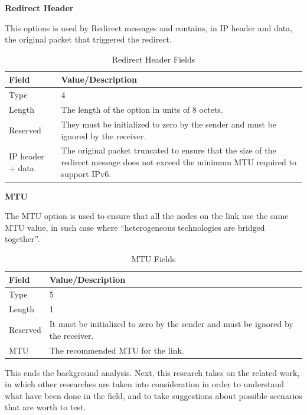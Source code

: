 \documentclass[12pt]{article}
\begin{document}
\textbf{Redirect Header}

This options is used by Redirect messages and contains, in IP header and data, the original packet that triggered the redirect.

\begin{savenotes}
\begin{table}[!htpb]
\centering
\addtolength{\tabcolsep}{3pt}
\begin{tabular}{|L{3.0cm}|L{12.0cm}|}
\hline
Field&Value/Description\\
\hline
Type&4\\
\hline
Length&The length of the option in units of 8 octets.\\
\hline
Reserved&They must be initialized to zero by the sender and must be ignored by the receiver.\\
\hline
IP header + data&The original packet truncated to ensure that the size of the redirect message does not exceed the minimum MTU required to support IPv6.\\
\hline
\end{tabular}
\caption{Redirect Header Fields}
\label{table:redirHead}
\end{table}
\end{savenotes}

\textbf{MTU}

The MTU option is used to ensure that all the nodes on the link use the same MTU value, in such case where ``heterogeneous technologies are bridged together''.

\begin{savenotes}
\begin{table}[!htpb]
\centering
\addtolength{\tabcolsep}{3pt}
\begin{tabular}{|L{3.0cm}|L{12.0cm}|}
\hline
Field&Value/Description\\
\hline
Type&5\\
\hline
Length&1\\
\hline
Reserved&It must be initialized to zero by the sender and must be ignored by the receiver.\\
\hline
MTU&The recommended MTU for the link.\\
\hline
\end{tabular}
\caption{MTU Fields}
\label{table:mtu}
\end{table}
\end{savenotes}


This ends the background analysis. Next, this research takes on the related work, in which other researches are taken into consideration in order to understand what have been done in the field, and to take suggestions about possible scenarios that are worth to test.
\end{document}
